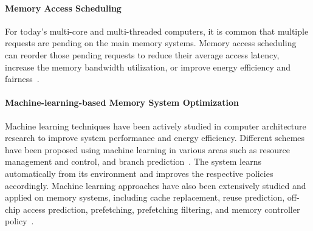 


\paragraph{Memory Access Scheduling}
For today's multi-core and multi-threaded computers, it is common
that multiple requests are pending on the main memory systems.
Memory access scheduling can reorder those pending requests
to reduce their average access latency, increase the memory
bandwidth utilization, or improve energy efficiency and
fairness~\cite{Rixner:ISCA-2000, Lin:HPCA-2001,
Zhu:HPCA-2002, Hasan:ISCA-2003,
Rixner:MICRO-2004, Hur:MICRO-2004, Zhu:HPCA-2005,
Nesbit:MICRO-2006, Mutlu:MICRO-2007, Shao:HPCA-2007,
Lee:MICRO-2008, Ipek:ISCA-2008, Mutlu:ISCA-2008,
Zheng:ICPP-2008,
Yuan:MICRO-2009, Hu:ICPDS-2009, Fang:ISPDP-2009,
Kim:MICRO-2010, Kim:HPCA-2010,
Ebrahimi:MICRO-2011, Muralidhara:MICRO-2011, Kaseridis:MICRO-2011,
Bojnordi:ISCA-2012, Ausavarungnirun:ISCA-2012, Subramanian:HPCA-2013,
Shin:HPCA-2014, Zhao:MICRO-2014, Jia:ICPADS-2014,
Lee:TC-2016, Subramanian:TPDS-2016,
Song:DATE-2018, Lee:TC-2025, Zhao:ISCA-2026}.

\paragraph{Machine-learning-based Memory System Optimization}

Machine learning techniques have been actively studied in computer
architecture research to improve system performance and energy efficiency.
Different schemes have been proposed using machine learning in various areas
such as resource management and control, and branch 
prediction~\cite{Bitirgen:MICRO-2008, Martinez:JMicro-2009, Gamatie:TC-2005, 
Gerogiannis:MICRO-2023, Jimenez:HPCA-2001, Loh:PACT-2002,
Seznec:ISCA-2005, Tarjan:TACO-2005, Seznec:CBP-2014,
Garza:ISCA-2019, Zangeneh:MICRO-2020, Koizumi:ISCA-2026}.
The system learns automatically from its environment and improves the
respective policies accordingly.  
Machine learning approaches have also been extensively studied
and applied on memory systems, including cache replacement,
reuse prediction, off-chip access prediction, prefetching, 
prefetching filtering, and memory controller 
policy~\cite{Bera:JMicro-2006,
Teran:MICRO-2016, Sethumurugan:HPCA-2021, Lu:HPCA-2024,
Bera:MICRO-2022, Bera:HPCA-2026,
Zhang:SC-2022, Lurbe:TC-2022, Shi:ASPLOS-2021, Duong:ISCA-2024,
Bhatia:ISCA-2019, Jamet:HPCA-2024,
Ipek:ISCA-2008}.

